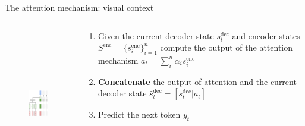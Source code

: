 \documentclass[12pt,aspectratio=169,handout]{beamer}
\begin{document}
\begin{frame}{The attention mechanism: visual context}

	\begin{columns}[T]
		\begin{column}{0.3\textwidth}
			\begin{figure}[h]
				\includegraphics[height=6.5cm]{seq2seq_attention_t1.pdf}
			\end{figure}	
		\end{column}
		\begin{column}{0.7\textwidth}
			\begin{enumerate}
			\pause
			\item Given the current decoder state $s^{\text{dec}}_t$ and encoder states $S^{\text{enc}} = \{s_i^{\text{enc}}\}_{i=1}^n$ 
				compute the output of the attention mechanism $a_t = \sum_i^n \alpha_i s_i^{\text{enc}}$
			\pause
			\item \textbf{Concatenate} the output of attention and the current decoder state $\hat{s}_t^{\text{dec}} = [s^{\text{dec}}_t | a_t]$
			\pause
			\item Predict the next token $y_t$
			\end{enumerate}
			\end{column}
	\end{columns}
	
\end{frame}
\end{document}
